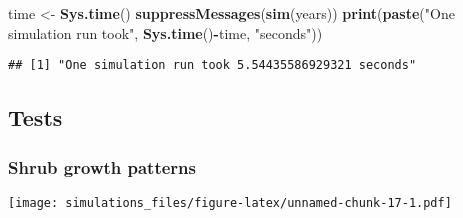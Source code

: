 \documentclass[]{article}
\newenvironment{Shaded}{\begin{snugshade}}{\end{snugshade}}
\newcommand{\KeywordTok}[1]{\textcolor[rgb]{0.13,0.29,0.53}{\textbf{#1}}}
\newcommand{\DataTypeTok}[1]{\textcolor[rgb]{0.13,0.29,0.53}{#1}}
\newcommand{\DecValTok}[1]{\textcolor[rgb]{0.00,0.00,0.81}{#1}}
\newcommand{\StringTok}[1]{\textcolor[rgb]{0.31,0.60,0.02}{#1}}
\newcommand{\OperatorTok}[1]{\textcolor[rgb]{0.81,0.36,0.00}{\textbf{#1}}}
\newcommand{\NormalTok}[1]{#1}
\begin{document}
\begin{Shaded}
\begin{Highlighting}[]
\NormalTok{time <-}\StringTok{ }\KeywordTok{Sys.time}\NormalTok{()}
\KeywordTok{suppressMessages}\NormalTok{(}\KeywordTok{sim}\NormalTok{(years))}
\KeywordTok{print}\NormalTok{(}\KeywordTok{paste}\NormalTok{(}\StringTok{"One simulation run took"}\NormalTok{, }\KeywordTok{Sys.time}\NormalTok{()}\OperatorTok{-}\NormalTok{time, }\StringTok{"seconds"}\NormalTok{))}
\end{Highlighting}
\end{Shaded}

\begin{verbatim}
## [1] "One simulation run took 5.54435586929321 seconds"
\end{verbatim}

\subsection{Tests}\label{tests}

\subsubsection{Shrub growth patterns}\label{shrub-growth-patterns}

\begin{Shaded}
\end{Shaded}

\texttt{[image: simulations\_files/figure-latex/unnamed-chunk-17-1.pdf]}

\begin{Shaded}
\end{Shaded}
\end{document}
